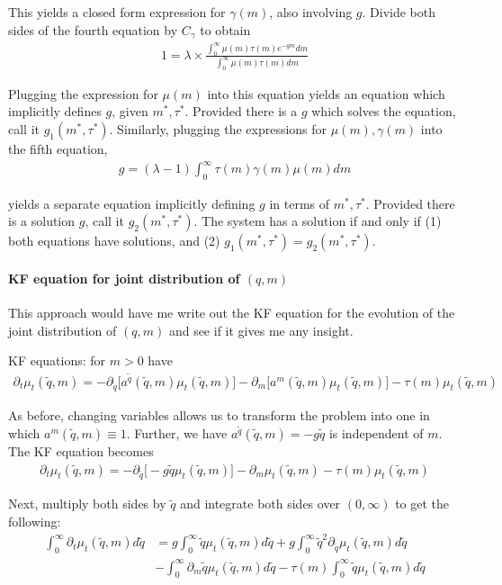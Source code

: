 \documentclass[12pt,english]{article}
\theoremstyle{remark}
\begin{document}
This yields a closed form expression for $\gamma(m)$, also involving $g$. Divide both sides of the fourth equation by $C_{\gamma}$ to obtain 
\begin{align*}
	1 = \lambda \times \frac{\int_0^{\infty} \mu(m) \tau(m) e^{-gm} dm}{\int_{0}^{\infty} \mu(m) \tau(m) dm}
\end{align*}

Plugging the expression for $\mu(m)$ into this equation yields an equation which implicitly defines $g$, given $m^*,\tau^*$. Provided there is a $g$ which solves the equation, call it $g_1(m^*,\tau^*)$. Similarly, plugging the expressions for $\mu(m),\gamma(m)$ into the fifth equation, 
\begin{align*}
	g = (\lambda -1) \int_{0}^{\infty} \tau(m) \gamma(m) \mu(m) dm
\end{align*}

yields a separate equation implicitly defining $g$ in terms of $m^*,\tau^*$. Provided there is a solution $g$, call it $g_2(m^*,\tau^*)$. The system has a solution if and only if (1) both equations have solutions, and (2) $g_1(m^*,\tau^*) = g_2(m^*,\tau^*)$. 

\paragraph{KF equation for joint distribution of $(q,m)$}

This approach would have me write out the KF equation for the evolution of the joint distribution of $(q,m)$ and see if it gives me any insight.

KF equations: for $m > 0$ have
\begin{align*}
	\partial_t \mu_t(\tilde{q},m) = -\partial_{\tilde{q}} \big[ a^{\tilde{q}} (\tilde{q},m) \mu_t(\tilde{q},m)  \big] -\partial_{m} \big[ a^{m} (\tilde{q},m) \mu_t(\tilde{q},m)  \big] - \tau(m)\mu_t(\tilde{q},m)
\end{align*}

As before, changing variables allows us to transform the problem into one in which $a^m(\tilde{q},m) \equiv 1$. Further, we have $a^{\tilde{q}} (\tilde{q},m) = - g\tilde{q}$ is independent of $m$. The KF equation becomes
\begin{align*}
	\partial_t \mu_t(\tilde{q},m) = -\partial_{\tilde{q}} \big[ -g\tilde{q} \mu_t(\tilde{q},m)  \big] -\partial_{m} \mu_t(\tilde{q},m) - \tau(m)\mu_t(\tilde{q},m)
\end{align*}

Next, multiply both sides by $\tilde{q}$ and integrate both sides over $(0,\infty)$ to get the following:
\begin{align*}
	\int_0^{\infty} \partial_t \mu_t(\tilde{q},m) d\tilde{q} &= g \int_0^{\infty} \tilde{q} \mu_t(\tilde{q},m) d\tilde{q} + g \int_{0}^{\infty} \tilde{q}^{2} \partial_{\tilde{q}}\mu_t(\tilde{q},m) d\tilde{q}  \\
	& - \int_{0}^{\infty} \partial_m \tilde{q}\mu_t(\tilde{q},m) d\tilde{q} - \tau(m)  \int_0^{\infty} \tilde{q}\mu_t(\tilde{q},m) d\tilde{q}
\end{align*}
\end{document}
